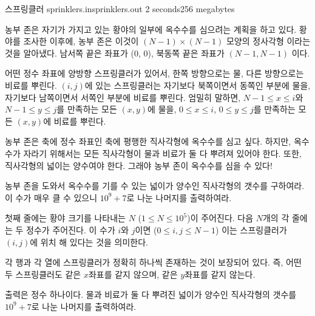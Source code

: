 \begin{problem}{스프링클러}
	{sprinklers.in}{sprinklers.out}
	{2 seconds}{256 megabytes}{}
	
	농부 존은 자기가 가지고 있는 황야의 일부에 옥수수를 심으려는 계획을 하고 있다. 황야를 조사한 이후에, 농부 존은 이것이 $(N-1) \times (N-1)$ 모양의 정사각형 이라는 것을 알아냈다. 남서쪽 끝은 좌표가 (0, 0), 북동쪽 끝은 좌표가 $(N-1, N-1)$ 이다.
	
	어떤 정수 좌표에 양방향 스프링클러가 있어서, 한쪽 방향으로는 물, 다른 방향으로는 비료를 뿌린다. $(i, j)$에 있는 스프링클러는 자기보다 북쪽이면서 동쪽인 부분에 물을, 자기보다 남쪽이면서 서쪽인 부분에 비료를 뿌린다. 엄밀히 말하면, $N-1 \le x \le i$와 $N-1 \le y \le j$를 만족하는 모든 $(x, y)$에 물을, $0 \le x \le i$, $0 \le y \le j$를 만족하는 모든 $(x, y)$에 비료를 뿌린다.
	
	
	농부 존은 축에 정수 좌표인 축에 평행한 직사각형에 옥수수를 심고 싶다. 하지만, 옥수수가 자라기 위해서는 모든 직사각형이 물과 비료가 둘 다 뿌려져 있어야 한다. 또한, 직사각형의 넓이는 양수여야 한다. 그래야 농부 존이 옥수수를 심을 수 있다!
	
	농부 존을 도와서 옥수수를 기를 수 있는 넓이가 양수인 직사각형의 갯수를 구하여라. 이 수가 매우 클 수 있으니 $10^9 + 7$로 나눈 나머지를 출력하여라.
	
	
	\InputFile
	
	첫째 줄에는 황야 크기를 나타내는 $N$ ($1 \le N \le 10^5$)이 주어진다. 다음 $N$개의 각 줄에는 두 정수가 주어진다. 이 수가 $i$와 $j$이면 ($0 \le i,j \le N-1$) 이는 스프링클러가 $(i, j)$에 위치 해 있다는 것을 의미한다.
	
	각 행과 각 열에 스프링클러가 정확히 하나씩 존재하는 것이 보장되어 있다. 즉, 어떤 두 스프링클러도 같은 $x$좌표를 같지 않으며, 같은 $y$좌표를 같지 않는다.

	\OutputFile
	
	출력은 정수 하나이다. 물과 비료가 둘 다 뿌려진 넓이가 양수인 직사각형의 갯수를 $10^9+7$로 나눈 나머지를 출력하여라.
	
	\Examples
		
	\begin{example}
	\end{example}

	
	
	
\end{problem}

